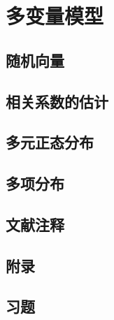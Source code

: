 \chapter{多变量模型}

\section{随机向量}

\pending

\section{相关系数的估计}

\pending

\section{多元正态分布}

\pending

\section{多项分布}

\pending

\section{文献注释}

\pending

\section{附录}

\pending

\section{习题}

\pending
